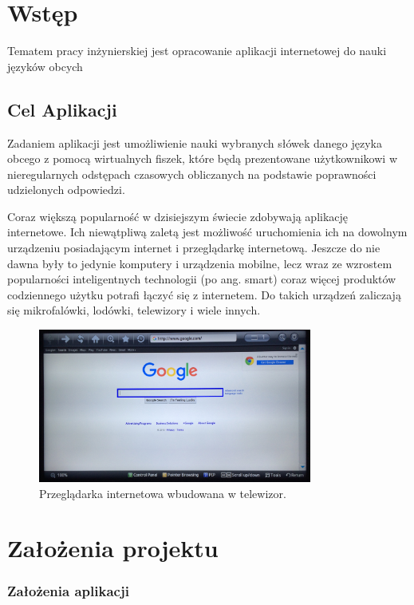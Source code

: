 {\let\cleardoublepage\relax \chapter{Wstęp}}
\label{cha:wstep}

Tematem pracy inżynierskiej jest opracowanie aplikacji internetowej do nauki języków obcych

\section{Cel Aplikacji}

Zadaniem aplikacji jest umożliwienie nauki wybranych słówek danego języka obcego z pomocą wirtualnych fiszek, które będą prezentowane użytkownikowi w nieregularnych odstępach czasowych obliczanych na podstawie poprawności udzielonych odpowiedzi.



Coraz większą popularność w dzisiejszym świecie zdobywają aplikację internetowe. Ich niewątpliwą zaletą jest możliwość uruchomienia ich na dowolnym urządzeniu posiadającym internet i przeglądarkę internetową. Jeszcze do nie dawna były to jedynie komputery i urządzenia mobilne, lecz wraz ze wzrostem popularności inteligentnych technologii (po ang. smart) coraz więcej produktów codziennego użytku potrafi łączyć się z internetem. Do takich urządzeń zaliczają się mikrofalówki, lodówki, telewizory i wiele innych.

\begin{figure}[h]
	\centering
	\includegraphics[height=50.5mm]{images/Browser.jpg}
	 \caption{Przeglądarka internetowa wbudowana w telewizor.}
\end{figure}




\newpage
{\let\cleardoublepage\relax \chapter{Założenia projektu}}
\subsection{Założenia aplikacji}


